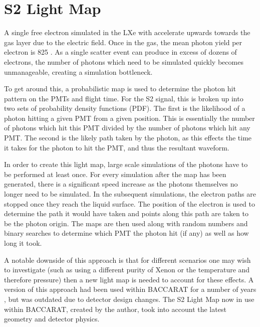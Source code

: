 \section{S2 Light Map}
\label{sec:s2lightmap}
\par
A single free electron simulated in the LXe with accelerate upwards towards the gas layer due to the electric field.
Once in the gas, the mean photon yield per electron is 825 \cite{NoPhotonsPerElectron}.
As a single scatter event can produce in excess of dozens of electrons, the number of photons which need to be simulated quickly becomes unmanageable, creating a simulation bottleneck.
\par
To get around this, a probabilistic map is used to determine the photon hit pattern on the PMTs and flight time.
For the S2 signal, this is broken up into two sets of probability density functions (PDF).
The first is the likelihood of a photon hitting a given PMT from a given position.
This is essentially the number of photons which hit this PMT divided by the number of photons which hit any PMT.
The second is the likely path taken by the photon, as this effects the time it takes for the photon to hit the PMT, and thus the resultant waveform.
\par
In order to create this light map, large scale simulations of the photons have to be performed at least once.
For every simulation after the map has been generated, there is a significant speed increase as the photons themselves no longer need to be simulated.
In the subsequent simulations, the electron paths are stopped once they reach the liquid surface.
The position of the electron is used to determine the path it would have taken and points along this path are taken to be the photon origin. %
The maps are then used along with random numbers and binary searches to determine which PMT the photon hit (if any) as well as how long it took.

\par
A notable downside of this approach is that for different scenarios one may wish to investigate (such as using a different purity of Xenon or the temperature and therefore pressure) then a new light map is needed to account for these effects.
A version of this approach had been used within BACCARAT for a number of years \cite{lz_simulations_ref}, but was outdated due to detector design changes.
The S2 Light Map now in use within BACCARAT, created by the author, took into account the latest geometry and detector physics.

